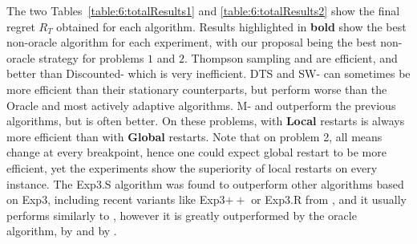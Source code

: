 
The two Tables~\ref{table:6:totalResults1} and \ref{table:6:totalResults2} show the final regret $R_T$ obtained for each algorithm.
Results highlighted in \textbf{bold} show the best non-oracle algorithm for each experiment,
with our proposal being the best non-oracle strategy for problems $1$ and $2$.
Thompson sampling and \klUCB{} are efficient,
and better than Discounted-\klUCB{} which is very inefficient.
DTS and SW-\klUCB{} can sometimes be more efficient than their stationary counterparts, but perform worse than the Oracle and most actively adaptive algorithms.
M-\klUCB{} and \CUSUMklUCB{} outperform the previous algorithms, but \GLRklUCB{} is often better.
%
On these problems, \GLRklUCB{} with \textbf{Local} restarts is always more efficient than with \textbf{Global} restarts. Note that on problem 2, all means change at every breakpoint, hence one could expect global restart to be more efficient, yet the experiments show the superiority of local restarts on every instance.
The Exp3.S algorithm was found to outperform other algorithms based on Exp3, including recent variants like Exp3$++$ \cite{Seldin17} or Exp3.R from \cite{Allesiardo17},
and it usually performs similarly to \MklUCB, however it is greatly outperformed by the oracle algorithm, by \GLRklUCB{} and by \CUSUMklUCB.


